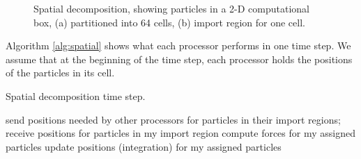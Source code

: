 \begin{figure}[htbp]
\begin{center}
 \qquad
{}
\caption{Spatial decomposition, showing particles in a 2-D computational box, (a) partitioned into
64 cells, (b) import region for one cell.}
\label{fig:spatial}
\end{center}
\end{figure}

Algorithm \ref{alg:spatial} shows what each processor performs in one time step.
We assume that at the beginning of the time step, each processor holds the positions
of the particles in its cell.
\begin{algorithm}
\caption{Spatial decomposition time step.}
\label{alg:spatial}
\begin{algorithmic}[1]
\STATE send positions needed by other processors for particles in their import regions;
receive positions for particles in my import region
\STATE compute forces for my assigned particles
\STATE update positions (integration) for my assigned particles
\end{algorithmic}
\end{algorithm}

